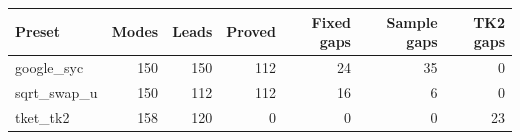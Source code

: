 \begin{center}\small\begin{tabular}{lrrrrrr}\toprule
Preset & Modes & Leads & Proved & Fixed gaps & Sample gaps & TK2 gaps\\\midrule
google\_syc & 150 & 150 & 112 & 24 & 35 & 0\\
sqrt\_swap\_u & 150 & 112 & 112 & 16 & 6 & 0\\
tket\_tk2 & 158 & 120 & 0 & 0 & 0 & 23\\
\bottomrule\end{tabular}\end{center}
